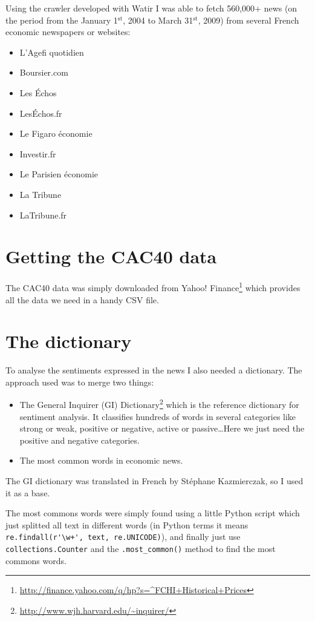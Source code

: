 \documentclass[12pt,a4wide]{report}
\newcommand{\superscript}[1]{\ensuremath{^{\textrm{#1}}}}
\newcommand{\st}[0]{\superscript{st}}
\begin{document}
			Using the crawler developed with Watir I was able to fetch 560,000+ news (on the period from the January 1\st, 2004 to March 31\st, 2009) from several French economic newspapers or websites:
			\begin{itemize}
				\item L'Agefi quotidien
				\item Boursier.com
				\item Les \'Echos
				\item Les\'Echos.fr
				\item Le Figaro économie
				\item Investir.fr
				\item Le Parisien économie
				\item La Tribune
				\item LaTribune.fr
			\end{itemize}
			
		\section{Getting the CAC40 data}
		
			The CAC40 data was simply downloaded from Yahoo! Finance\footnote{\url{http://finance.yahoo.com/q/hp?s=^FCHI+Historical+Prices}} which provides all the data we need in a handy  CSV file.
		
		\section{The dictionary}
		
			To analyse the sentiments expressed in the news I also needed a dictionary. The approach used was to merge two things:
			\begin{itemize}
				\item The General Inquirer (GI) Dictionary\footnote{\url{http://www.wjh.harvard.edu/~inquirer/}} which is the reference dictionary for sentiment analysis. It classifies hundreds of words in several categories like strong or weak, positive or negative, active or passive\ldots Here we just need the positive and negative categories.
				\item The most common words in economic news.
			\end{itemize}
			
			The GI dictionary was translated in French by Stéphane Kazmierczak, so I used it as a base.
			
			The most commons words were simply found using a little Python script which just splitted all text in different words (in Python terms it means \lstinline!re.findall(r'\w+', text, re.UNICODE)!), and finally just use \lstinline!collections.Counter! and the \lstinline!.most_common()! method to find the most commons words.
			
\end{document}
